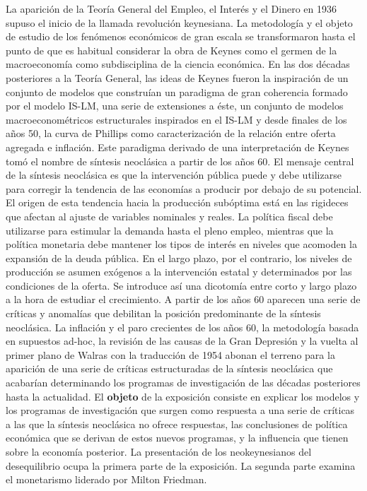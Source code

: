 \documentclass{nuevotema}
\begin{document}
\ideaclave

La aparición de la Teoría General del Empleo, el Interés y el Dinero en 1936 supuso el inicio de la llamada revolución keynesiana. La metodología y el objeto de estudio de los fenómenos económicos de gran escala se transformaron hasta el punto de que es habitual considerar la obra de Keynes como el germen de la macroeconomía como subdisciplina de la ciencia económica. En las dos décadas posteriores a la Teoría General, las ideas de Keynes fueron la inspiración de un conjunto de modelos que construían un paradigma de gran coherencia formado por el modelo IS-LM, una serie de extensiones a éste, un conjunto de modelos macroeconométricos estructurales inspirados en el IS-LM y desde finales de los años 50, la curva de Phillips como caracterización de la relación entre oferta agregada e inflación. Este paradigma derivado de una interpretación de Keynes tomó el nombre de síntesis neoclásica a partir de los años 60. El mensaje central de la síntesis neoclásica es que la intervención pública puede y debe utilizarse para corregir la tendencia de las economías a producir por debajo de su potencial. El origen de esta tendencia hacia la producción subóptima está en las rigideces que afectan al ajuste de variables nominales y reales. La política fiscal debe utilizarse para estimular la demanda hasta el pleno empleo, mientras que la política monetaria debe mantener los tipos de interés en niveles que acomoden la expansión de la deuda pública. En el largo plazo, por el contrario, los niveles de producción se asumen exógenos a la intervención estatal y determinados por las condiciones de la oferta. Se introduce así una dicotomía entre corto y largo plazo a la hora de estudiar el crecimiento. A partir de los años 60 aparecen una serie de críticas y anomalías que debilitan la posición predominante de la síntesis neoclásica. La inflación y el paro crecientes de los años 60, la metodología basada en supuestos ad-hoc, la revisión de las causas de la Gran Depresión y la vuelta al primer plano de Walras con la traducción de 1954 abonan el terreno para la aparición de una serie de críticas estructuradas de la síntesis neoclásica que acabarían determinando los programas de investigación de las décadas posteriores hasta la actualidad. El \textbf{objeto} de la exposición consiste en explicar los modelos y los programas de investigación que surgen como respuesta a una serie de críticas a las que la síntesis neoclásica no ofrece respuestas, las conclusiones de política económica que se derivan de estos nuevos programas, y la influencia que tienen sobre la economía posterior. La presentación de los neokeynesianos del desequilibrio ocupa la primera parte de la exposición. La segunda parte examina el monetarismo liderado por Milton Friedman.
\end{document}
